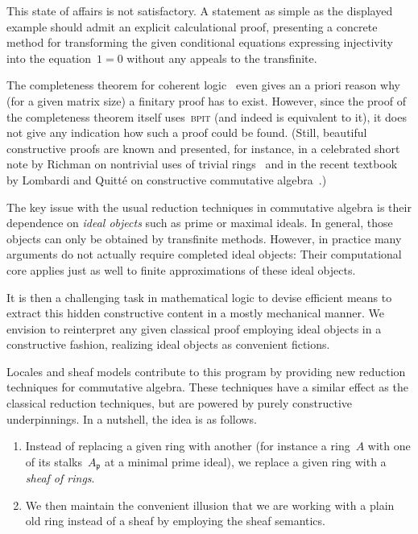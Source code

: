 \documentclass{ws-rv9x6}
\newcommand{\ppp}{\mathfrak{p}}
\renewcommand{\_}{\mathpunct{.}}
\newcommand{\?}{\,{:}\,}
\newcommand{\BPIT}{\textsc{bpit}\xspace}
\begin{document}
This state of affairs is not satisfactory. A statement as simple as the
displayed example should admit an explicit calculational proof, presenting a
concrete method for transforming the given conditional equations expressing
injectivity into the equation~$1 = 0$ without any appeals to the transfinite.

The completeness theorem for coherent logic~\cite[Corollary~D1.5.10]{johnstone:elephant} even
gives an a priori reason why (for a given matrix size) a finitary proof has to
exist. However, since the proof of the completeness theorem itself uses~\BPIT
(and indeed is equivalent to it), it does not give any indication how such a
proof could be found. (Still, beautiful constructive proofs are known and
presented, for instance, in a celebrated short note by Richman on nontrivial
uses of trivial rings~\cite{richman:trivial-rings} and in the recent textbook by
Lombardi and Quitté on constructive commutative
algebra~\cite{lombardi-quitte:constructive-algebra}.)

The key issue with the usual reduction techniques in commutative algebra is
their dependence on \emph{ideal objects} such as prime or maximal ideals. In
general, those objects can only be obtained by transfinite methods. However, in
practice many arguments do not actually require completed ideal objects:
Their computational core applies just as well to finite approximations of
these ideal objects.

It is then a challenging task in mathematical logic to devise efficient means to
extract this hidden constructive content in a mostly mechanical manner. We
envision to reinterpret any given classical proof employing ideal objects in a
constructive fashion, realizing ideal objects as convenient fictions.

Locales and sheaf models contribute to this program by providing new reduction
techniques for commutative algebra. These techniques have a similar effect as the
classical reduction techniques, but are powered by purely constructive
underpinnings. In a nutshell, the idea is as follows.

\begin{enumerate}
\item Instead of replacing a given ring with another (for instance a ring~$A$ with
one of its stalks~$A_\ppp$ at a minimal prime ideal), we replace a given ring
with a \emph{sheaf of rings}.
\item We then maintain the convenient illusion that we are working with a plain old ring
instead of a sheaf by employing the sheaf semantics.
\end{enumerate}
\end{document}
